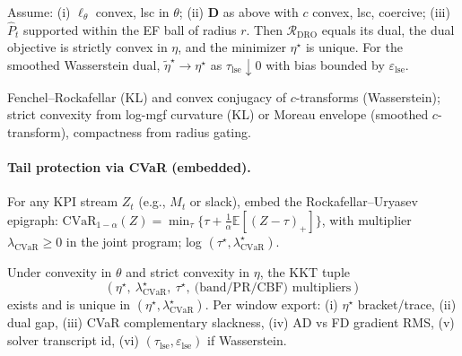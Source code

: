 \begin{theorem}\label{thm:duality-uniq}
\emph{}
Assume: (i) $\ell_\theta$ convex, lsc in $\theta$; (ii) $\mathbf D$ as above with $c$ convex, lsc, coercive; (iii) $\hat P_t$ supported within the EF ball of radius $r$.
Then $\mathcal R_{\mathrm{DRO}}$ equals its dual, the dual objective is strictly convex in $\eta$, and the minimizer $\eta^\star$ is unique.
For the smoothed Wasserstein dual, $\tilde\eta^\star\to\eta^\star$ as $\tau_{\mathrm{lse}}\downarrow 0$ with bias bounded by $\varepsilon_{\mathrm{lse}}$.
\begin{proofsketch}
Fenchel–Rockafellar (KL) and convex conjugacy of $c$-transforms (Wasserstein); strict convexity from log-mgf curvature (KL) or Moreau envelope (smoothed $c$-transform), compactness from radius gating.
\end{proofsketch}
\end{theorem}

\paragraph{Tail protection via CVaR (embedded).}
For any KPI stream $Z_t$ (e.g., $M_t$ or slack), embed the Rockafellar–Uryasev epigraph:
$\mathrm{CVaR}_{1-\alpha}(Z)=\min_{\tau}\{\tau+\tfrac{1}{\alpha}\mathbb E[(Z-\tau)_+]\}$,
with multiplier $\lambda_{\mathrm{CVaR}}\!\ge\!0$ in the joint program; log $(\tau^\star,\lambda_{\mathrm{CVaR}}^\star)$.

\begin{proposition}\label{prop:kkt-ops2}
\emph{}
Under convexity in $\theta$ and strict convexity in $\eta$, the KKT tuple
\[
\left(\eta^\star,\ \lambda_{\mathrm{CVaR}}^\star,\ \tau^\star,\ \text{(band/PR/CBF) multipliers}\right)
\]
exists and is unique in $(\eta^\star,\lambda_{\mathrm{CVaR}}^\star)$.
Per window export: (i) $\eta^\star$ bracket/trace, (ii) dual gap, (iii) CVaR complementary slackness, (iv) AD vs FD gradient RMS, (v) solver transcript id, (vi) $(\tau_{\mathrm{lse}},\varepsilon_{\mathrm{lse}})$ if Wasserstein.
\end{proposition}

